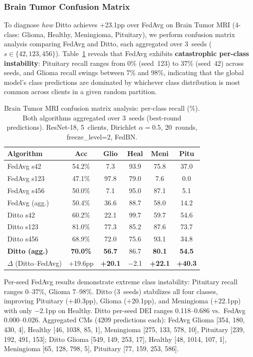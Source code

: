 \documentclass[conference,a4paper]{IEEEtran}
\begin{document}
\subsubsection{Brain Tumor Confusion Matrix}
\label{sec:confusion_matrix_bt}

To diagnose \textit{how} Ditto achieves $+$23.1pp over FedAvg on Brain Tumor MRI (4-class: Glioma, Healthy, Meningioma, Pituitary), we perform confusion matrix analysis comparing FedAvg and Ditto, each aggregated over 3~seeds ($s \in \{42, 123, 456\}$). Table~\ref{tab:confusion_matrix_bt} reveals that FedAvg exhibits \textbf{catastrophic per-class instability}: Pituitary recall ranges from 0\% (seed~123) to 37\% (seed~42) across seeds, and Glioma recall swings between 7\% and 98\%, indicating that the global model's class predictions are dominated by whichever class distribution is most common across clients in a given random partition.

\begin{table}[htbp]
\centering
\caption{Brain Tumor MRI confusion matrix analysis: per-class recall (\%). Both algorithms aggregated over 3~seeds (best-round predictions). ResNet-18, 5~clients, Dirichlet $\alpha{=}0.5$, 20~rounds, freeze\_level=2, FedBN.}
\label{tab:confusion_matrix_bt}
\small
\begin{tabular}{lccccc}
\toprule
\textbf{Algorithm} & \textbf{Acc} & \textbf{Glio} & \textbf{Heal} & \textbf{Meni} & \textbf{Pitu} \\
\midrule
FedAvg s42 & 54.2\% & 7.3 & 93.9 & 75.8 & 37.0 \\
FedAvg s123 & 47.1\% & 97.8 & 79.0 & 7.6 & 0.0 \\
FedAvg s456 & 50.0\% & 7.1 & 95.0 & 87.1 & 5.1 \\
\midrule
FedAvg (agg.) & 50.4\% & 36.6 & 88.7 & 58.0 & 14.2 \\
\midrule
Ditto s42 & 60.2\% & 22.1 & 99.7 & 59.7 & 54.6 \\
Ditto s123 & 81.0\% & 77.3 & 85.2 & 87.6 & 73.7 \\
Ditto s456 & 68.9\% & 72.0 & 75.6 & 93.1 & 34.8 \\
\midrule
\textbf{Ditto (agg.)} & \textbf{70.0\%} & \textbf{56.7} & 86.7 & \textbf{80.1} & \textbf{54.5} \\
\midrule
$\Delta$ (Ditto--FedAvg) & +19.6pp & \textbf{+20.1} & $-$2.1 & \textbf{+22.1} & \textbf{+40.3} \\
\bottomrule
\end{tabular}

\vspace{1mm}
\footnotesize{Per-seed FedAvg results demonstrate extreme class instability: Pituitary recall ranges 0--37\%, Glioma 7--98\%. Ditto (3~seeds) stabilizes all four classes, improving Pituitary ($+$40.3pp), Glioma ($+$20.1pp), and Meningioma ($+$22.1pp) with only $-$2.1pp on Healthy. Ditto per-seed DEI ranges 0.118--0.686 vs.\ FedAvg 0.000--0.026. Aggregated CMs (4209 predictions each): FedAvg Glioma [354, 180, 430, 4], Healthy [46, 1038, 85, 1], Meningioma [275, 133, 578, 10], Pituitary [239, 192, 491, 153]; Ditto Glioma [549, 149, 253, 17], Healthy [48, 1014, 107, 1], Meningioma [65, 128, 798, 5], Pituitary [77, 159, 253, 586].}
\end{table}
\end{document}
